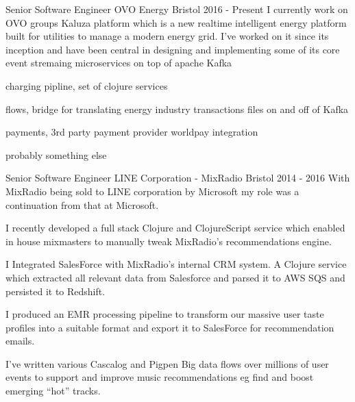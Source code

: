 \begin{cventries}

  \cventrypara
  {Senior Software Engineer} %
  {OVO Energy} %
  {Bristol} %
  {2016  - Present} %
  {I currently work on OVO groups Kaluza platform which is a new realtime intelligent energy platform built for utilities to
  manage a modern energy grid. I've worked on it since its inception and have been central in designing and implementing
  some of its core event stremaing microservices on top of apache Kafka }
  {
    \begin{cvitems} %
      \item {charging pipline, set of clojure services}
      \item {flows, bridge for translating energy industry transactions files on and off of Kafka }
      \item {payments, 3rd party payment provider worldpay integration}
      \item {probably something else}
    \end{cvitems}
  }

  \cventrypara
    {Senior Software Engineer} %
    {LINE Corporation - MixRadio} %
    {Bristol} %
    {2014  - 2016} %
    {With MixRadio being sold to LINE corporation by Microsoft my role was a continuation from that at Microsoft.}
    {
      \begin{cvitems} %
        \item {I recently developed a full stack Clojure and ClojureScript service which enabled in house mixmasters to manually tweak MixRadio's recommendations engine.}
        \item {I Integrated SalesForce with MixRadio’s internal CRM system. A Clojure service which extracted all relevant data from Salesforce and parsed it to AWS SQS and persisted it to Redshift.}
        \item {I produced an EMR processing pipeline to transform our massive user taste profiles into a suitable format and export it to SalesForce for recommendation emails.}
        \item {I’ve written various Cascalog and Pigpen Big data flows over millions of user events to support and improve music recommendations eg find and boost emerging “hot” tracks.}
      \end{cvitems}
    }


\end{cventries}
